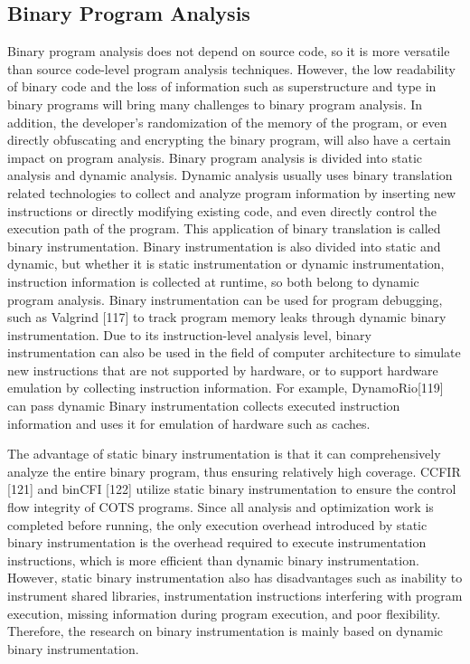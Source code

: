 \subsection{Binary Program Analysis}
Binary program analysis does not depend on source code, so it is more versatile than source code-level program analysis techniques.
However, the low readability of binary code and the loss of information such as superstructure and type in binary programs will bring many challenges to binary program analysis.
In addition, the developer's randomization of the memory of the program, or even directly obfuscating and encrypting the binary program, will also have a certain impact on program analysis.
Binary program analysis is divided into static analysis and dynamic analysis.
Dynamic analysis usually uses binary translation related technologies to collect and analyze program information by inserting new instructions or directly modifying existing code, and even directly control the execution path of the program.
This application of binary translation is called binary instrumentation.
Binary instrumentation is also divided into static and dynamic, but whether it is static instrumentation or dynamic instrumentation, instruction information is collected at runtime, so both belong to dynamic program analysis.
Binary instrumentation can be used for program debugging, such as Valgrind [117] to track program memory leaks through dynamic binary instrumentation.
Due to its instruction-level analysis level, binary instrumentation can also be used in the field of computer architecture to simulate new instructions that are not supported by hardware, or to support hardware emulation by collecting instruction information.
For example, DynamoRio[119] can pass dynamic Binary instrumentation collects executed instruction information and uses it for emulation of hardware such as caches.

The advantage of static binary instrumentation is that it can comprehensively analyze the entire binary program, thus ensuring relatively high coverage.
CCFIR [121] and binCFI [122] utilize static binary instrumentation to ensure the control flow integrity of COTS programs.
Since all analysis and optimization work is completed before running, the only execution overhead introduced by static binary instrumentation is the overhead required to execute instrumentation instructions, which is more efficient than dynamic binary instrumentation.
However, static binary instrumentation also has disadvantages such as inability to instrument shared libraries, instrumentation instructions interfering with program execution, missing information during program execution, and poor flexibility.
Therefore, the research on binary instrumentation is mainly based on dynamic binary instrumentation.

